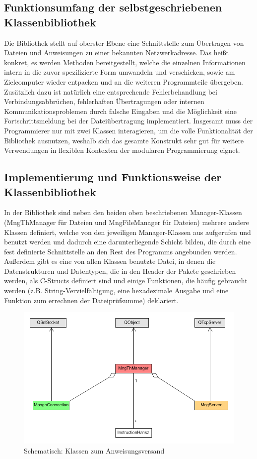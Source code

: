 \subsection{Funktionsumfang der selbstgeschriebenen Klassenbibliothek}
Die Bibliothek stellt auf oberster Ebene eine Schnittstelle zum Übertragen von Dateien und Anweisungen zu einer bekannten Netzwerkadresse.
Das heißt konkret, es werden Methoden bereitgestellt, welche die einzelnen Informationen intern in die zuvor spezifizierte Form umwandeln und verschicken, sowie am Zielcomputer wieder entpacken und an die weiteren Programmteile übergeben.
Zusätzlich dazu ist natürlich eine entsprechende Fehlerbehandlung bei Verbindungsabbrüchen, fehlerhaften Übertragungen oder internen Kommunikationsproblemen durch falsche Eingaben und die Möglichkeit eine Fortschrittsmeldung bei der Dateiübertragung implementiert.
Insgesamt muss der Programmierer nur mit zwei Klassen interagieren, um die volle Funktionalität der Bibliothek ausnutzen, weshalb sich das gesamte Konstrukt sehr gut für weitere Verwendungen in flexiblen Kontexten der modularen Programmierung eignet.

\subsection{Implementierung und Funktionsweise der Klassenbibliothek}
In der Bibliothek sind neben den beiden oben beschriebenen Manager-Klassen (MngThManager für Dateien und MngFileManager für Dateien) mehrere andere Klassen definiert, welche von den jeweiligen Manager-Klassen aus aufgerufen und benutzt werden und dadurch eine darunterliegende Schicht bilden, die durch eine fest definierte Schnittstelle an den Rest des Programms angebunden werden.
Außerdem gibt es eine von allen Klassen benutzte Datei, in denen die Datenstrukturen und Datentypen, die in den Header der Pakete geschrieben werden, als C-Structs definiert sind und einige Funktionen, die häufig gebraucht werden (z.B. String-Vervielfältigung, eine hexadezimale Ausgabe und eine Funktion zum errechnen der Dateiprüfsumme) deklariert.\par

\begin{figure}
\includegraphics[scale=.4]{classDiagInstr}
\caption{Schematisch: Klassen zum Anweisungsversand}
\label{inst_d}
\end{figure}

